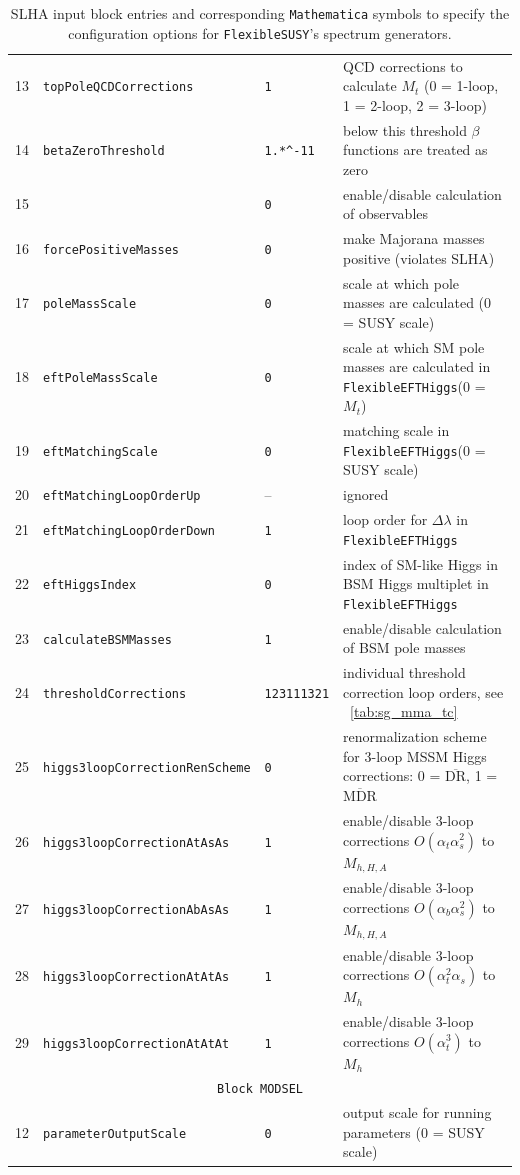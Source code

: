 \documentclass[final,3p,11pt,pdflatex]{elsarticle}
\makeatletter
\newcommand{\fs}{\texttt{FlexibleSUSY}\@\xspace}
\newcommand{\feft}{\texttt{Flex\-ib\-le\-EFT\-Higgs}\@\xspace}
\newcommand{\mathematica}{\texttt{Ma\-the\-ma\-ti\-ca}\xspace}
\newcommand{\code}[1]{\lstinline|#1|}  %
\newcommand{\ol}[1]{\overline{#1}}
\newcommand{\DRbar}{\ensuremath{\ol{\text{DR}}}\xspace}
\newcommand{\MDRbar}{\ensuremath{\ol{\text{MDR}}}\xspace}
\newcommand{\tabref}[1]{\tablename~\ref{#1}}
\def\at{\alpha_t}
\def\ab{\alpha_b}
\def\as{\alpha_s}
\makeatother
\begin{document}
\begin{table}
{\begin{tabularx}{1.2\textwidth}{lllX}
    13 & \code{topPoleQCDCorrections}         & \code{1} &
    QCD corrections to calculate $M_t$ (0 = 1-loop, 1 = 2-loop, 2 = 3-loop)\\
    14 & \code{betaZeroThreshold}             & \code{1.*^-11} &
    below this threshold $\beta$ functions are treated as zero\\
    15 & & \code{0} & enable/disable calculation of observables\\
    16 & \code{forcePositiveMasses}           & \code{0} &
    make Majorana masses positive (violates SLHA)\\
    17 & \code{poleMassScale}                 & \code{0} &
    scale at which pole masses are calculated (0 = SUSY scale)\\
    18 & \code{eftPoleMassScale}              & \code{0} &
    scale at which SM pole masses are calculated in \feft (0 = $M_t$)\\
    19 & \code{eftMatchingScale}              & \code{0} &
    matching scale in \feft (0 = SUSY scale)\\
    20 & \code{eftMatchingLoopOrderUp}        & -- &
    ignored\\
    21 & \code{eftMatchingLoopOrderDown}      & \code{1} &
    loop order for $\Delta\lambda$ in \feft\\
    22 & \code{eftHiggsIndex}                 & \code{0} &
    index of SM-like Higgs in BSM Higgs multiplet in \feft\\
    23 & \code{calculateBSMMasses}            & \code{1} &
    enable/disable calculation of BSM pole masses\\
    24 & \code{thresholdCorrections}          & \code{123111321} &
    individual threshold correction loop orders, see \tabref{tab:sg_mma_tc}\\
    25 & \code{higgs3loopCorrectionRenScheme} & \code{0} &
    renormalization scheme for 3-loop MSSM Higgs corrections:
    0 = \DRbar, 1 = \MDRbar\\
    26 & \code{higgs3loopCorrectionAtAsAs}    & \code{1} &
    enable/disable 3-loop corrections $O(\at\as^2)$ to $M_{h,H,A}$\\
    27 & \code{higgs3loopCorrectionAbAsAs}    & \code{1} &
    enable/disable 3-loop corrections $O(\ab\as^2)$ to $M_{h,H,A}$\\
    28 & \code{higgs3loopCorrectionAtAtAs}    & \code{1} &
    enable/disable 3-loop corrections $O(\at^2\as)$ to $M_{h}$\\
    29 & \code{higgs3loopCorrectionAtAtAt}    & \code{1} &
    enable/disable 3-loop corrections $O(\at^3)$ to $M_{h}$\\
    \midrule
    \multicolumn{4}{c}{\texttt{Block MODSEL}}\\
    \midrule
    12 & \code{parameterOutputScale}          & \code{0} &
    output scale for running parameters (0 = SUSY scale)\\
    \bottomrule
  \end{tabularx}}
  \caption{SLHA input block entries and corresponding \mathematica
    symbols to specify the configuration options for \fs's spectrum
    generators.}
  \label{tab:sg_mma_options}
\end{table}
\end{document}
